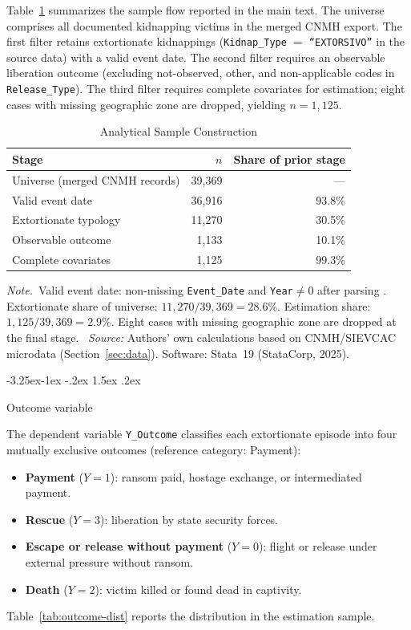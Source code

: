 \documentclass[12pt]{article}
\makeatletter
\numberwithin{equation}{section}
\numberwithin{table}{section}
\renewcommand\subsection{\@startsection{subsection}{2}{\z@}%
                                     {-3.25ex\@plus -1ex \@minus -.2ex}%
                                     {1.5ex \@plus .2ex}%
                                     {\normalfont\large\bfseries\raggedright}}
\newcommand{\tabnote}{\par\addvspace{0.4em}\noindent\emph{Note.}}
\newcommand{\tabsource}{\ \textit{Source:} Authors' own calculations based on
CNMH/SIEVCAC microdata (Section~\ref{sec:data}). Software: Stata~19
(StataCorp, 2025).}
\makeatother
\begin{document}
Table~\ref{tab:sample-flow} summarizes the sample flow reported in the main
text. The universe comprises all documented kidnapping victims in the merged
CNMH export. The first filter retains extortionate kidnappings
(\texttt{Kidnap\_Type} $=$ \texttt{``EXTORSIVO''} in the source data) with a valid event date. The second
filter requires an observable liberation outcome (excluding not-observed,
other, and non-applicable codes in \texttt{Release\_Type}). The third
filter requires complete covariates for estimation; eight cases with missing
geographic zone are dropped, yielding $n=1{,}125$.

\begin{table}[t]
\centering
\caption{Analytical Sample Construction}
\label{tab:sample-flow}
\begin{tabular}{@{}lrr@{}}
\toprule
Stage & $n$ & Share of prior stage \\
\midrule
Universe (merged CNMH records) & 39,369 & --- \\
Valid event date & 36,916 & 93.8\% \\
Extortionate typology & 11,270 & 30.5\% \\
Observable outcome & 1,133 & 10.1\% \\
Complete covariates & 1,125 & 99.3\% \\
\bottomrule
\end{tabular}
\tabnote\ Valid event date: non-missing \texttt{Event\_Date} and \texttt{Year}$\neq 0$
after parsing . Extortionate share of universe:
$11{,}270/39{,}369=28.6\%$. Estimation share: $1{,}125/39{,}369=2.9\%$. Eight
cases with missing geographic zone are dropped at the final stage.
\tabsource
\end{table}

\subsection{Outcome variable}

The dependent variable \texttt{Y\_Outcome} classifies each extortionate
episode into four mutually exclusive outcomes (reference category: Payment):
\begin{itemize}
\item \textbf{Payment} ($Y=1$): ransom paid, hostage exchange, or
  intermediated payment.
\item \textbf{Rescue} ($Y=3$): liberation by state security forces.
\item \textbf{Escape or release without payment} ($Y=0$):
  flight or release under external pressure without ransom.
\item \textbf{Death} ($Y=2$): victim killed or found dead in captivity.
\end{itemize}
Table~\ref{tab:outcome-dist} reports the distribution in the estimation
sample.
\end{document}
